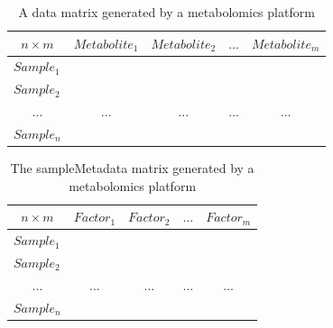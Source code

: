 \documentclass[ENG, BIB]{TFUOC}%
\begin{document}
\begin{table}[htbp]
    \centering
    \caption{A data matrix generated by a metabolomics platform}
    \label{tab:dataMatrix-example}
    \begin{tabular}{@{}lllll@{}}
        \toprule
        \multicolumn{1}{c}{$n \times m$} & \multicolumn{1}{c}{$Metabolite_1$} & \multicolumn{1}{c}{$Metabolite_2$} & \multicolumn{1}{c}{$\dots$} & \multicolumn{1}{c}{$Metabolite_m$} \\ \midrule
        $Sample_1$                       &                                    &                                    &                             &                                    \\
        $Sample_2$                       &                                    &                                    &                             &                                    \\
        \multicolumn{1}{c}{$\dots$}      & \multicolumn{1}{c}{$\dots$}        & \multicolumn{1}{c}{$\dots$}        & \multicolumn{1}{c}{$\dots$} & \multicolumn{1}{c}{$\dots$}        \\
        $Sample_n$                       &                                    &                                    &                             &                                    \\ \bottomrule
    \end{tabular}
\end{table}
\begin{table}[htbp]
    \centering
    \caption{The sampleMetadata matrix generated by a metabolomics platform}
    \label{tab:sampleMetadata-example}
    \begin{tabular}{@{}lllll@{}}
        \toprule
        \multicolumn{1}{c}{$n \times m$} & \multicolumn{1}{c}{$Factor_1$} & \multicolumn{1}{c}{$Factor_2$} & \multicolumn{1}{c}{$\dots$} & \multicolumn{1}{c}{$Factor_m$} \\ \midrule
        $Sample_1$                       &                                &                                &                             &                                \\
        $Sample_2$                       &                                &                                &                             &                                \\
        \multicolumn{1}{c}{$\dots$}      & \multicolumn{1}{c}{$\dots$}    & \multicolumn{1}{c}{$\dots$}    & \multicolumn{1}{c}{$\dots$} & \multicolumn{1}{c}{$\dots$}    \\
        $Sample_n$                       &                                &                                &                             &                                \\ \bottomrule
    \end{tabular}
\end{table}
\end{document}
